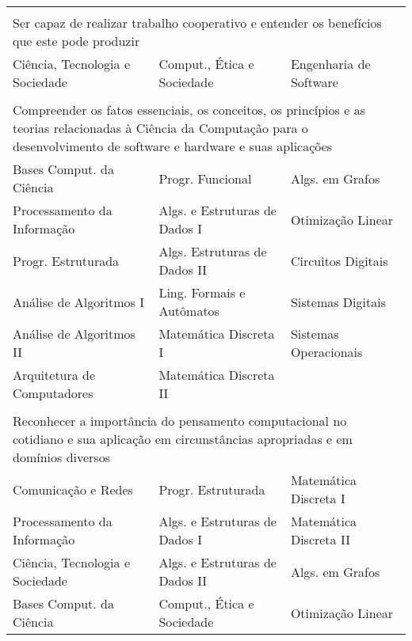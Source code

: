 \begin{longtable}{|p{}p{}p{}|}
    \multicolumn{3}{p{0.95\textwidth}}{}\\
    \multicolumn{3}{p{0.95\textwidth}}{Ser capaz de realizar trabalho cooperativo e entender os
    benefícios que este pode produzir}\\
    \hline
    \textcolor{nred}{Ciência, Tecnologia e Sociedade} &
    \textcolor{nblue}{Comput., Ética e Sociedade} &
    \textcolor{nblue}{Engenharia de Software}\\
    \hline
    
    \multicolumn{3}{p{0.95\textwidth}}{}\\
    \multicolumn{3}{p{0.95\textwidth}}{Compreender os fatos essenciais, os
    conceitos, os princípios e as teorias relacionadas à Ciência da Computação
    para o desenvolvimento de software e hardware e suas aplicações}\\
    \hline
    \textcolor{nred}{Bases Comput. da Ciência} &
    \textcolor{nblue}{Progr. Funcional} & 
    \textcolor{nblue}{Algs. em Grafos} \\
    \textcolor{nred}{Processamento da Informação} &
    \textcolor{nblue}{Algs. e Estruturas de Dados I} &
    \textcolor{nblue}{Otimização Linear}\\
    \textcolor{nblue}{Progr. Estruturada} & 
    \textcolor{nblue}{Algs. Estruturas de Dados II} &
    \textcolor{nblue}{Circuitos Digitais}\\
    \textcolor{nblue}{Análise de Algoritmos I} &
    \textcolor{nblue}{Ling. Formais e Autômatos} &
    \textcolor{nblue}{Sistemas Digitais}\\
    \textcolor{nblue}{Análise de Algoritmos II} &
    \textcolor{nblue}{Matemática Discreta I} &
    \textcolor{nblue}{Sistemas Operacionais}\\
    \textcolor{nblue}{Arquitetura de Computadores} & 
    \textcolor{nblue}{Matemática Discreta II} & \\
    \hline
    
    \multicolumn{3}{p{0.95\textwidth}}{}\\
    \multicolumn{3}{p{0.95\textwidth}}{Reconhecer a importância do pensamento
    computacional no cotidiano e sua aplicação em circunstâncias apropriadas e
    em domínios diversos}\\
    \hline
    \textcolor{nred}{Comunicação e Redes} &
    \textcolor{nblue}{Progr. Estruturada} &
    \textcolor{nblue}{Matemática Discreta I} \\
    \textcolor{nred}{Processamento da Informação} &
    \textcolor{nblue}{Algs. e Estruturas de Dados I}&
    \textcolor{nblue}{Matemática Discreta II}\\
    \textcolor{nred}{Ciência, Tecnologia e Sociedade} &
    \textcolor{nblue}{Algs. e Estruturas de Dados II}&
    \textcolor{nblue}{Algs. em Grafos}\\
    \textcolor{nred}{Bases Comput. da Ciência} &
    \textcolor{nblue}{Comput., Ética e Sociedade} &
    \textcolor{nblue}{Otimização Linear}\\
    \hline
    

\end{longtable}
